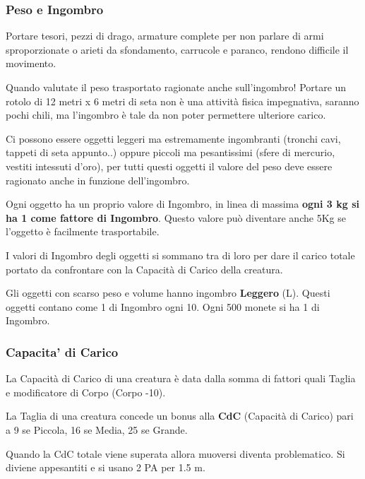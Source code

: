 \documentclass[12pt,a4paper,twoside,openany]{book}
\begin{document}
\begin{multicols}{2}
\label{sec:capacita-di-carico-e-trasporto-ingombro}

\subsubsection{Peso e Ingombro}

Portare tesori, pezzi di drago, armature complete per non parlare di armi sproporzionate o arieti da sfondamento, carrucole e paranco, rendono difficile il movimento.

Quando valutate il peso trasportato ragionate anche sull'ingombro!
Portare un rotolo di 12 metri x 6 metri di seta non è una attività fisica impegnativa, saranno pochi chili, ma l'ingombro è tale da non poter permettere ulteriore carico.

Ci possono essere oggetti leggeri ma estremamente ingombranti (tronchi cavi, tappeti di seta appunto..) oppure piccoli ma pesantissimi (sfere di mercurio, vestiti intessuti d'oro), per tutti questi oggetti il valore del peso deve essere ragionato anche in funzione dell'ingombro.

Ogni oggetto ha un proprio valore di Ingombro, in linea di massima \textbf{ogni 3 kg si ha 1 come fattore di Ingombro}. Questo valore può diventare anche 5Kg se l'oggetto è facilmente trasportabile.

I valori di Ingombro degli oggetti si sommano tra di loro per dare il carico totale portato da confrontare con la Capacità di Carico della creatura.

Gli oggetti con scarso peso e volume hanno ingombro \textbf{Leggero} (L). Questi oggetti contano come 1 di Ingombro ogni 10. Ogni 500 monete si ha 1 di Ingombro.


\subsubsection{Capacita' di Carico}\label{capacitadicarico}

La Capacità di Carico di una creatura è data dalla somma di fattori quali Taglia e modificatore di Corpo (Corpo -10).

La Taglia di una creatura concede un bonus alla \textbf{CdC} (Capacità di Carico) pari a 9 se Piccola, 16 se Media, 25 se Grande.

Quando la CdC totale viene superata allora muoversi diventa problematico.  Si diviene appesantiti e si usano 2 PA per 1.5 m. 


\end{multicols}
\end{document}
